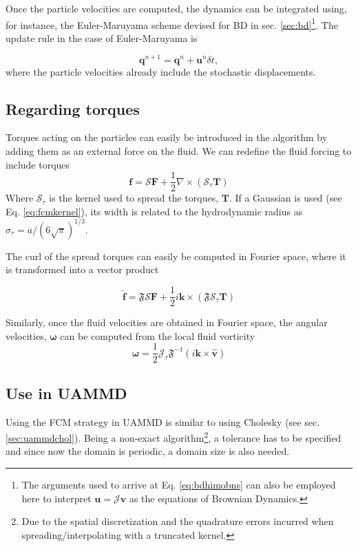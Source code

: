 \documentclass[twoside,openright,titlepage,numbers=noenddot,%
headinclude,footinclude,cleardoublepage=empty,abstract=on,
BCOR=5mm,fontsize=11pt, dvipsnames, paper=b5
]{scrreprt}
\renewcommand{\vec}[1]{\bm{#1}}
\newcommand{\oper}[1]{\mathcal{#1}}
\newcommand{\uammd}{\gls{UAMMD}\xspace}
\newcommand{\dt}{\delta t}
\newcommand{\half}{\frac{1}{2}}
\newcommand{\fou}[1]{\widehat{#1}}
\newcommand{\ppos}{q}
\newcommand{\pvel}{u}
\newcommand{\fvel}{v}
\begin{document}
Once the particle velocities are computed, the dynamics can be integrated using, for instance, the Euler-Maruyama scheme devised for \gls{BD} in sec. \ref{sec:bd}\footnote{The arguments used to arrive at Eq. \eqref{eq:bdhimobns} can also be employed here to interpret $\vec{\pvel}=\oper{J}\vec{\fvel}$ as the equations of Brownian Dynamics.}. The update rule in the case of Euler-Maruyama is

\begin{equation}
  \label{eq:fcmupdate}
  \vec{\ppos}^{n+1} = \vec{\ppos}^n + \vec{\pvel}^n\dt,
\end{equation}
where the particle velocities already include the stochastic displacements.

\subsection*{Regarding torques}

Torques acting on the particles can easily be introduced in the algorithm by adding them as an external force on the fluid. We can redefine the fluid forcing to include torques
\begin{equation}
\vec{f} = \oper{S}\vec{F} + \half\nabla\times(\oper{S}_\tau\vec{T})
\end{equation}
Where $\oper{S}_\tau$ is the kernel used to spread the torques, $\vec{T}$. If a Gaussian is used (see Eq. \eqref{eq:fcmkernel}), its width is related to the hydrodynamic radius as $\sigma_\tau = a/(6\sqrt{\pi})^{1/3}$.

The curl of the spread torques can easily be computed in Fourier space, where it is transformed into a vector product

\begin{equation}
\fou{\vec{f}} = \mathfrak{F}\oper{S}\vec{F} + \half i\vec{k}\times(\mathfrak{F}\oper{S}_\tau\vec{T})
\end{equation}

Similarly, once the fluid velocities are obtained in Fourier space, the angular velocities, $\vec{\omega}$ can be computed from the local fluid vorticity
\begin{equation}
  \vec{\omega} = \half\oper{J}_\tau\mathfrak{F}^{-1}\left(i\vec{k}\times\fou{\vec{\fvel}}\right)
\end{equation}


\subsection*{Use in UAMMD}
Using the \gls{FCM} strategy in \uammd is similar to using Cholesky (see sec. \ref{sec:uammdchol}). Being a non-exact algorithm\footnote{Due to the spatial discretization and the quadrature errors incurred when spreading/interpolating with a truncated kernel.}, a tolerance has to be specified and since now the domain is periodic, a domain size is also needed.
\end{document}
